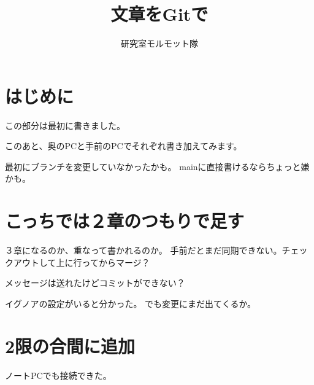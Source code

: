 \documentclass[a4j]{ujarticle}
\title{文章をGitで}
\author{研究室モルモット隊}
\begin{document}
\maketitle
\tableofcontents

\section{はじめに}
この部分は最初に書きました。

このあと、奥のPCと手前のPCでそれぞれ書き加えてみます。

最初にブランチを変更していなかったかも。
mainに直接書けるならちょっと嫌かも。

\section{こっちでは２章のつもりで足す}
３章になるのか、重なって書かれるのか。
手前だとまだ同期できない。チェックアウトして上に行ってからマージ？

メッセージは送れたけどコミットができない？

イグノアの設定がいると分かった。
でも変更にまだ出てくるか。

\section{2限の合間に追加}
ノートPCでも接続できた。
\end{document}
